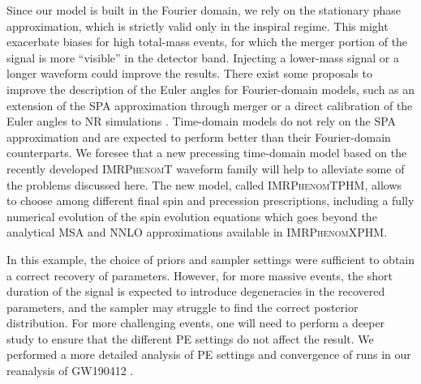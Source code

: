 \documentclass[%
aps,
prd,
amssymb,
amsmath,
amsfonts,
eqsecnum,
showpacs,
nofootinbib,
floatfix,
twocolumn,
twoside,
a4paper,
superscriptaddress
]{revtex4-1}
\newcommand{\phXPHM}{\textsc{IMRPhenomXPHM}\xspace}
\begin{document}
Since our model is built in the Fourier domain, we rely on the stationary phase approximation, which is strictly valid only in the inspiral regime. This might exacerbate biases for high total-mass events, for which the merger portion of the signal is more ``visible'' in the detector band. Injecting a lower-mass signal or a longer waveform could improve the results.
There exist some proposals to improve the description of the Euler angles for Fourier-domain models, such as an extension of the SPA approximation through merger \cite{marsat2018fourierdomain} or a direct calibration of the Euler angles to NR simulations \cite{eleanor}. Time-domain models do not rely on the SPA approximation and are expected to perform better than their Fourier-domain counterparts. We foresee that a new precessing time-domain model based on the recently developed \textsc{IMRPhenomT} waveform family \cite{phenomt, phenomthm} will help to alleviate some of the problems discussed here. The new model, called \textsc{IMRPhenomTPHM}, allows to choose among different final spin and precession prescriptions, including a fully numerical evolution of the spin evolution equations which goes beyond the analytical MSA and NNLO approximations available in \phXPHM. %


In this example, the choice of priors and sampler settings were sufficient to obtain a correct recovery of parameters. However, for more massive events, the short duration of the signal is expected to introduce degeneracies in the recovered parameters, and the sampler may struggle to find the correct posterior distribution. For more challenging events, one will need to perform a deeper study to ensure that the different PE settings do not affect the result. We performed a more detailed analysis of PE settings and convergence of runs in our reanalysis of GW190412 \cite{GW190412_uib}.
\end{document}
